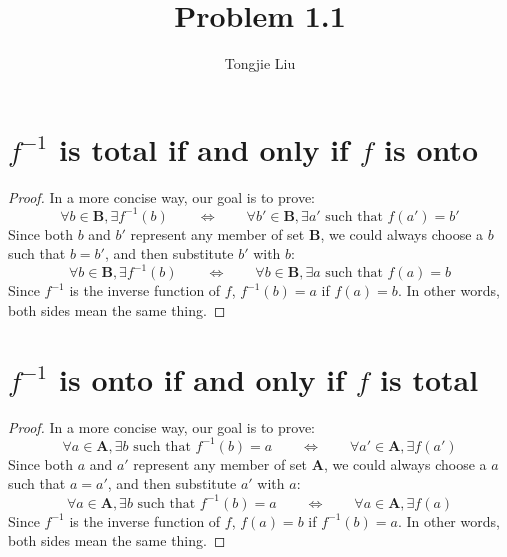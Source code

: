 \documentclass{article}
\title{Problem 1.1}
\author{Tongjie Liu}
\begin{document}
\maketitle


\section{$f^{-1}$ is total if and only if $f$ is onto}
\begin{proof}
	In a more concise way, our goal is to prove:
	\begin{equation*}
		\forall b \in \mathbf{B}, \exists f^{-1}(b)
		\qquad \Leftrightarrow \qquad
		\forall b' \in \mathbf{B}, \exists a' \text{ such that }
		f(a') = b'
	\end{equation*}
	Since both $b$ and $b'$ represent any member of set $\mathbf{B}$,
	we could always choose a $b$ such that $b = b'$, and then substitute
	$b'$ with $b$:
	\begin{equation*}
		\forall b \in \mathbf{B}, \exists f^{-1}(b)
		\qquad \Leftrightarrow \qquad
		\forall b \in \mathbf{B}, \exists a \text{ such that }
		f(a) = b
	\end{equation*}
	Since $f^{-1}$ is the inverse function of $f$, $f^{-1}(b) = a$ if
	$f(a) = b$. In other words, both sides mean the same thing.
\end{proof}


\section{$f^{-1}$ is onto if and only if $f$ is total}
\begin{proof}
	In a more concise way, our goal is to prove:
	\begin{equation*}
		\forall a \in \mathbf{A}, \exists b \text{ such that }
		f^{-1}(b) = a
		\qquad \Leftrightarrow \qquad
		\forall a' \in \mathbf{A}, \exists f(a')
	\end{equation*}
	Since both $a$ and $a'$ represent any member of set $\mathbf{A}$,
	we could always choose a $a$ such that $a = a'$, and then substitute
	$a'$ with $a$:
	\begin{equation*}
		\forall a \in \mathbf{A}, \exists b \text{ such that }
		f^{-1}(b) = a
		\qquad \Leftrightarrow \qquad
		\forall a \in \mathbf{A}, \exists f(a)
	\end{equation*}
	Since $f^{-1}$ is the inverse function of $f$, $f(a) = b$ if
	$f^{-1}(b) = a$. In other words, both sides mean the same thing.
\end{proof}
\end{document}

